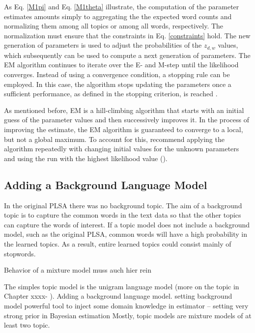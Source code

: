 \documentclass[11pt,a4paper,english,oneside]{book}
\numberwithin{equation}{chapter}
\begin{document}
As Eq. \ref{M1pi} and Eq. \ref{M1theta} illustrate, the computation of the parameter estimates amounts simply to aggregating the the expected word counts and normalizing them among all topics or among all words, respectively. The normalization must ensure that the constraints in Eq. \ref{constraints} hold. The new generation of parameters is used to adjust the probabilities of the $z_{d,w}$ values, which subsequently can be used to compute a next generation of parameters. The EM algorithm continues to iterate over the E- and M-step until the likelihood converges. Instead of using a convergence condition, a stopping rule can be employed. In this case, the algorithm stops updating the parameters once a sufficient performance, as defined in the stopping criterion, is reached \citep[p. 182--183]{Hofmann.2001}. 

As mentioned before, EM is a hill-climbing algorithm that starts with an initial guess of the parameter values and then successively improves it. In the process of improving the estimate, the EM algorithm is guaranteed to converge to a local, but not a global maximum. To account for this, \citeauthor{Zhai.2016} recommend applying the algorithm repeatedly with changing initial values for the unknown parameters and using the run with the highest likelihood value (\citeyear[p. 363--368]{Zhai.2016}).

\subsection{Adding a Background Language Model}

In the original PLSA \cite{Hofmann.1999} there was no background topic. The aim of a background topic is to capture the common words in the text data so that the other topics can capture the words of interest. If a topic model does not include a background model, such as the original PLSA, common words will have a high probability in the learned topics. As a result, entire learned topics could consist mainly of stopwords. 

Behavior of a mixture model muss auch hier rein




The simples topic model is the unigram language model (more on the topic in Chapter xxxx- ). Adding a background language model.  setting background model powerful tool to inject some domain knowledge
in estimator – setting very strong prior in Bayesian estimation Mostly, topic models are mixture models of at least two topic. 
\end{document}
